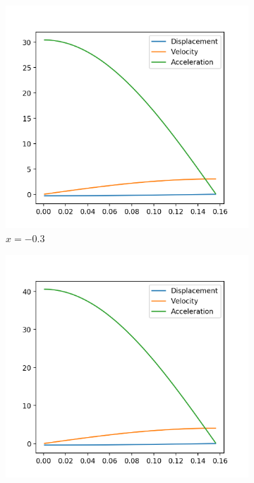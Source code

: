 \documentclass[12pt, letterpaper]{article}
\begin{document}
\begin{figure}[h]
  \caption{Varying Displacement}
  \label{fig:varyingDisplacement}
  \centering
  \begin{subfigure}[b]{.3\linewidth}
    \includegraphics[width=\linewidth]{Hooke/hooke7000-0_3.png}
    \caption{$x=-0.3$}
  \end{subfigure}
  \begin{subfigure}[b]{.3\linewidth}
    \includegraphics[width=\linewidth]{Hooke/hooke7000-0_4.png}

\end{subfigure}
\end{figure}
\end{document}
